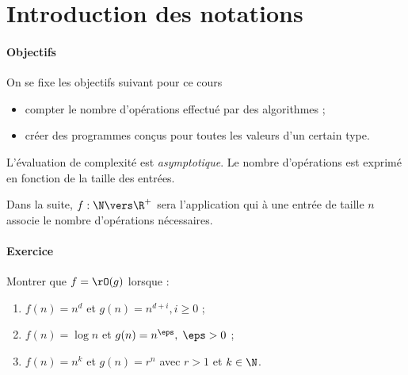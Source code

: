 \documentclass{mybourbaki}
\begin{document}
\section*{Introduction des notations}

\paragraph{Objectifs}On se fixe les objectifs suivant pour ce cours
\begin{itemize}
\item compter le nombre d'opérations effectué par des algorithmes ;
\item créer des programmes conçus pour toutes les valeurs d'un certain type.
\end{itemize}
L'évaluation de complexité est \textit{asymptotique}. Le nombre d'opérations est exprimé en fonction de la \og taille \fg{} des entrées.

Dans la suite, $f: \N \vers \R^+$ sera l'application qui à une entrée de taille $n$ associe le nombre d'opérations nécessaires.



\paragraph{Exercice}Montrer que $f = \rO(g)$ lorsque :
\begin{enumerate}
\item $f(n) = n^{d}$ et $g(n) = n^{d+i}, i\geq 0$ ;
\item $f(n) = \log n$ et $g(n) = n^{\eps}, \; \eps> 0$ ;
\item $f(n) = n^{k}$ et $g(n) = r^{n}$ avec $r>1$ et $k\in \N$.
\end{enumerate}
\end{document}
